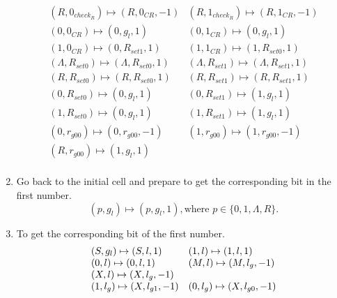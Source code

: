 \documentclass[a4papper]{article}
\theoremstyle{neosn}
\begin{document}
\begin{enumerate}
\[            \begin{array}{ll}
                (R, 0_{check_R}) \mapsto (R, 0_{CR}, -1) & (R, 1_{check_R}) \mapsto (R, 1_{CR}, -1) \\
                (0, 0_{CR}) \mapsto (0, g_{l}, 1) & (0, 1_{CR}) \mapsto (0, g_{l}, 1) \\
                (1, 0_{CR}) \mapsto (0, R_{set1}, 1) & (1, 1_{CR}) \mapsto (1, R_{set0}, 1)\\
                (\Lambda, R_{set0}) \mapsto (\Lambda, R_{set0}, 1) & (\Lambda, R_{set1}) \mapsto (\Lambda, R_{set1}, 1) \\
                (R, R_{set0}) \mapsto (R, R_{set0}, 1) & (R, R_{set1}) \mapsto (R, R_{set1}, 1)\\
                (0, R_{set0}) \mapsto (0, g_{l}, 1) & (0, R_{set1}) \mapsto (1, g_{l}, 1) \\
                (1, R_{set0}) \mapsto (0, g_{l}, 1) & (1, R_{set1}) \mapsto (1, g_{l}, 1) \\
                (0, r_{g00}) \mapsto (0, r_{g00}, -1) & (1, r_{g00}) \mapsto (1, r_{g00}, -1) \\
                (R, r_{g00}) \mapsto (1, g_{l}, 1) & \\
            \end{array}
        \]
        \item Go back to the initial cell and prepare to get the corresponding bit in the first number.
        \[
            (p, g_l) \mapsto (p, g_l, 1), \text{where } p \in \{0,1,\Lambda,R\}.
        \]
        \item To get the corresponding bit of the first number.
        \[
            \begin{array}{ll}
                (S, g_{l}) \mapsto (S, l, 1) & (1, l) \mapsto (1, l, 1) \\
                (0, l) \mapsto (0, l, 1) & (M, l) \mapsto (M, l_{g}, -1) \\
                (X, l) \mapsto (X, l_{g}, -1) & \\
                (1, l_{g}) \mapsto (X, l_{g1}, -1) & (0, l_{g}) \mapsto (X, l_{g0}, -1)\\
            \end{array} \\

\]
\end{enumerate}
\end{document}
